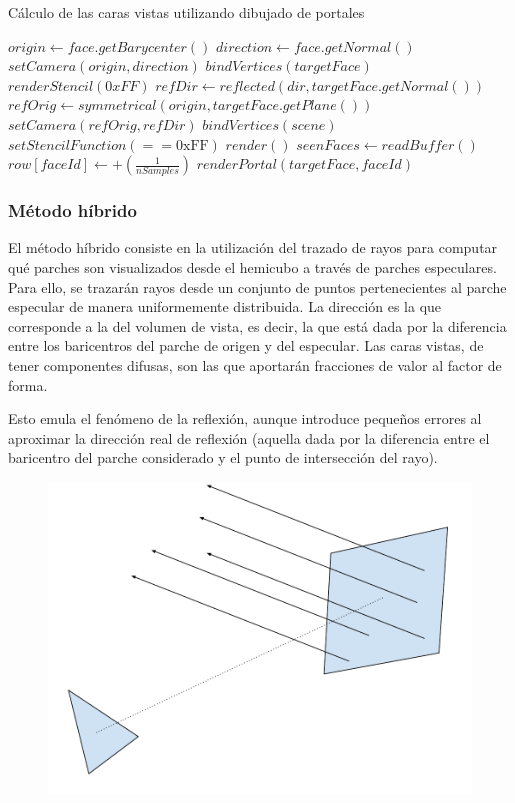 \clearpage

\begin{algorithm}
	\caption{Cálculo de las caras vistas utilizando dibujado de portales}
	\label{alg:2}
	\begin{algorithmic}
		\State $origin \gets face.getBarycenter()$
		\State $direction \gets face.getNormal()$
		\State $setCamera(origin, direction)$
		\State $bindVertices(targetFace)$
		\State $renderStencil(0xFF)$
		\State $refDir \gets reflected(dir, targetFace.getNormal())$
		\State $refOrig \gets symmetrical(origin, targetFace.getPlane())$
		\State $setCamera(refOrig, refDir)$
		\State $bindVertices(scene)$
		\State $setStencilFunction(== \text{0xFF})$
		\State $render()$
		\State $seenFaces \gets readBuffer()$
				\State $row[faceId] \gets +(\frac{1}{nSamples})$
					\State $renderPortal(targetFace, faceId)$
				\EndIf
			\EndIf
		\EndLoop
		\EndFunction
	\end{algorithmic}
\end{algorithm}

\subsubsection{Método híbrido}

El método híbrido consiste en la utilización del trazado de rayos para computar qué parches son visualizados desde el hemicubo a través de parches especulares. Para ello, se trazarán rayos desde un conjunto de puntos pertenecientes al parche especular de manera uniformemente distribuida. La dirección es la que corresponde a la del volumen de vista, es decir, la que está dada por la diferencia entre los baricentros del parche de origen y del especular. Las caras vistas, de tener componentes difusas, son las que aportarán fracciones de valor al factor de forma.

Esto emula el fenómeno de la reflexión, aunque introduce pequeños errores al aproximar la dirección real de reflexión (aquella dada por la diferencia entre el baricentro del parche considerado y el punto de intersección del rayo).

\begin{figure}[H]
	\centering
	\includegraphics[width=.8\linewidth]{assets/Hibrido}
	\label{img:hibrido}
\end{figure}

